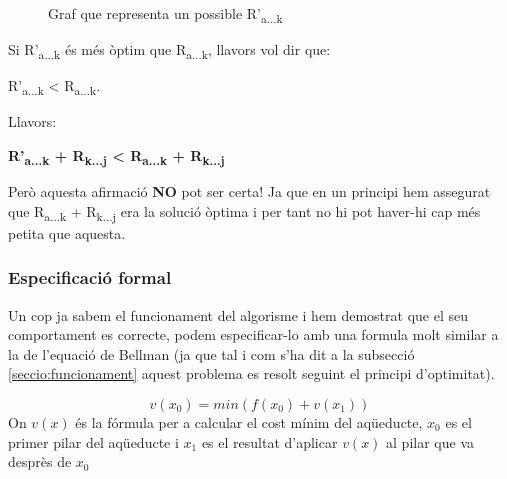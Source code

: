 \documentclass[12pt, letterpaper]{article}
\begin{document}
\begin{figure}[htbp]
\begin{center}
\caption{Graf que representa un possible R'\textsubscript{a...k}}
\label{demostracio:atoktojhypotetical}
\end{center}
\end{figure}

Si R'\textsubscript{a...k} és més òptim que R\textsubscript{a...k}, llavors vol dir que: \\
\begin{center}
R'\textsubscript{a...k} < R\textsubscript{a...k}.\\
\end{center}
Llavors:\\
\begin{center}
\textbf{R'\textsubscript{a...k} + R\textsubscript{k...j} < R\textsubscript{a...k} + R\textsubscript{k...j}} \\
\end{center}

Però aquesta afirmació \textbf{NO} pot ser certa! Ja que en un principi hem assegurat que R\textsubscript{a...k} + R\textsubscript{k...j} era la solució òptima i per tant no hi pot haver-hi cap més petita que aquesta.


\subsubsection{Especificació formal}
Un cop ja sabem el funcionament del algorisme i hem demostrat que el seu comportament es correcte, podem especificar-lo amb una formula molt similar a la de l'equació de Bellman (ja que tal i com s'ha dit a la subsecció \ref{seccio:funcionament} aquest problema es resolt seguint el principi d'optimitat).

\begin{center}
\begin{equation}
v(x_{0}) = min(f(x_{0}) + v(x_{1}))
\end{equation}
On $v(x)$ és la fórmula per a calcular el cost mínim del aqüeducte, $x_{0}$ es el primer pilar del aqüeducte i $x_{1}$ es el resultat d'aplicar $v(x)$ al pilar que va desprès de $x_{0}$
\end{center}
\end{document}
